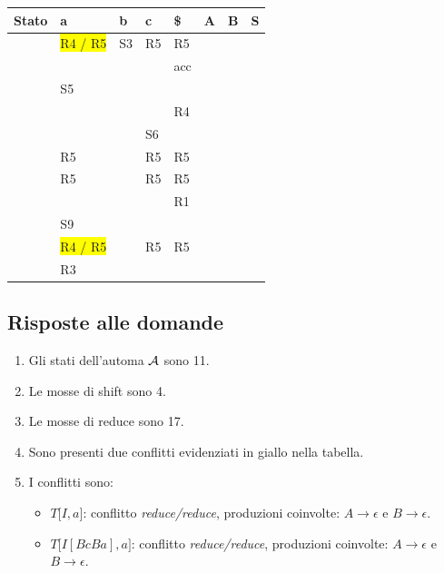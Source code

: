 \documentclass[11pt]{article}
\begin{document}
\begin{table}[H]
  \centering
  \begin{tabularx}{\textwidth}{|>{\centering\arraybackslash}X|>{\centering\arraybackslash}X|>{\centering\arraybackslash}X|>{\centering\arraybackslash}X|>{\centering\arraybackslash}X|>{\centering\arraybackslash}X|>{\centering\arraybackslash}X|>{\centering\arraybackslash}X|}
  \hline
  \textbf{Stato} & \textbf{a} & \textbf{b} & \textbf{c} & \textbf{\$} & \textbf{A} & \textbf{B} & \textbf{S} \\
  \hline
  0 & \colorbox{yellow}{R4 / R5} & S3 & R5 & R5 & 2 & 4 & 1 \\
  \hline
  1 &  &  &  & acc &  &  & \\
  \hline
  2 & S5 &  &  &  &  &  & \\
  \hline
  3 &  &  &  & R4 &  &  &  \\
  \hline
  4 &  &  & S6 &  &  &  & \\
  \hline
  5 & R5 &  & R5 & R5 &  & 7 & \\
  \hline
  6 & R5 &  & R5 & R5 &  & 8 & \\
  \hline
  7 &  &  &  & R1 &  &  & \\
  \hline
  8 & S9 &  &  &  &  &  & \\
  \hline
  9 & \colorbox{yellow}{R4 / R5} &  & R5 & R5 & 10 & 4 & \\
  \hline
  10 & R3 &  &  &  &  &  & \\
  \hline
  \end{tabularx}
  \label{tab:01-parsing-table}
\end{table}

\subsection{Risposte alle domande}

\begin{enumerate}
  \item Gli stati dell'automa $\cal A$ sono 11.
  \item Le mosse di shift sono 4.
  \item Le mosse di reduce sono 17.
  \item Sono presenti due conflitti evidenziati in giallo nella tabella.
  \item I conflitti sono:
  \begin{itemize}
    \item $T\big[I, a\big]$: conflitto \textit{reduce/reduce}, produzioni coinvolte: $A\rightarrow \epsilon$ e $B\rightarrow \epsilon$.
    \item $T\big[I[BcBa], a\big]$: conflitto \textit{reduce/reduce}, produzioni coinvolte: $A\rightarrow \epsilon$ e $B\rightarrow \epsilon$.
  \end{itemize}
\end{enumerate}
\end{document}
